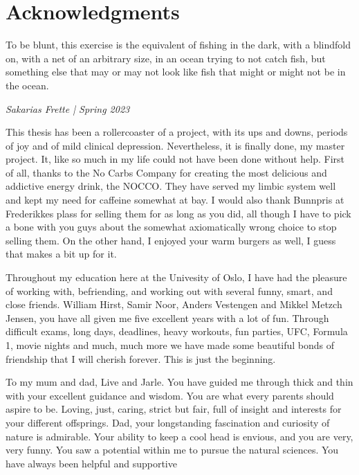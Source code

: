 \chapter*{Acknowledgments}



\epigraph{
    To be blunt, this exercise is the equivalent of fishing in the dark, 
    with a blindfold on, with a net of an arbitrary size, 
in an ocean trying to not catch fish, but something else 
that may or may not look like fish that might or might not be in the ocean.}{\textit{Sakarias Frette | Spring 2023}}

This thesis has been a rollercoaster of a project, with its ups and downs, periods of joy and of mild 
clinical depression.
Nevertheless, it is finally done, my master project. It, like so much in my life could not have been 
done without help. 
First of all, thanks to the No Carbs Company for creating the most delicious and addictive energy drink, 
the NOCCO. They have 
served my limbic system well and kept my need for caffeine somewhat at bay. I would also thank Bunnpris 
at Frederikkes plass 
for selling them for as long as you did, all though I have to pick a bone with you guys about the somewhat axiomatically 
wrong choice to stop selling them. On the other hand, I enjoyed your warm burgers as well, I guess that makes a bit up for it. \par 
Throughout my education here at the Univesity of Oslo, I have had the pleasure of working with, befriending, 
and working out with several funny, smart, and close friends. William Hirst, Samir Noor, Anders Vestengen and 
Mikkel Metzch Jensen, you have all given me five excellent years with a lot of fun. Through difficult exams, long days, deadlines, 
heavy workouts, fun parties, UFC, Formula 1, movie nights and much, much more we have made some beautiful bonds of friendship 
that I will cherish forever. This is just the beginning. \par 
To my mum and dad, Live and Jarle. You have guided me through thick and thin with your excellent guidance and wisdom. 
You are what every parents should aspire to be. Loving, just, caring, strict but fair, full of insight and interests for your 
different offsprings. Dad, your longstanding fascination and curiosity of nature  is admirable. Your ability to keep a cool head is envious, 
and you are very, very funny. You saw a potential within me to pursue the natural sciences. You have always been helpful and supportive 
